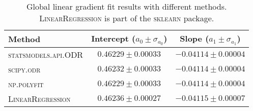 
\begin{table}
\caption{Global linear gradient fit results with different methods. \textsc{LinearRegression} is part of the \textsc{sklearn} package.}
\label{tab:global_fit_results_per_method}
\begin{tabularx}{\columnwidth}{lCC}
\hline
Method & Intercept ($a_0 \pm \sigma_{a_0}$) & Slope ($a_1 \pm \sigma_{a_1}$) \\
\hline
\textsc{statsmodels.api.ODR} & $0.46229 \pm 0.00033$ & $-0.04114 \pm 0.00004$ \\
\textsc{scipy.odr} & $0.46232 \pm 0.00033$ & $-0.04114 \pm 0.00004$ \\
\textsc{np.polyfit} & $0.46229 \pm 0.00033$ & $-0.04114 \pm 0.00004$ \\
\textsc{LinearRegression} & $0.46236 \pm 0.00027$ & $-0.04115 \pm 0.00007$ \\
\hline
\end{tabularx}
\end{table}
